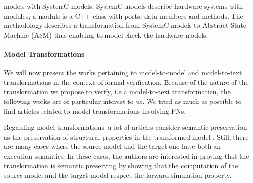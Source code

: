 \documentclass[pdflatex,sn-mathphys]{sn-jnl}%
\theoremstyle{thmstyleone}%
\theoremstyle{thmstyletwo}%
\theoremstyle{thmstylethree}%
\begin{document}
models with SystemC models. SystemC models describe hardware systems
with modules; a module is a C++ class with ports, data members and
methods. The methodology describes a transformation from SystemC
models to Abstract State Machine (ASM) thus enabling to model-check
the hardware models. %

\paragraph{Model Transformations}


We will now present the works pertaining to model-to-model and
model-to-text transformations in the context of formal
verification. Because of the nature of the transformation we propose
to verify, i.e a model-to-text transformation, the following works are
of particular interest to us.  We tried as much as possible to find
articles related to model transformations involving PNs.

Regarding model transformations, a lot of articles consider semantic
preservation as the preservation of structural properties in the
transformed model
\cite{Berramla2015,Calegari2011,Meghzili2017}. Still, there are many
cases where the source model and the target one have both an execution
semantics. In these cases, the authors are interested in proving that
the transformation is semantic preserving by showing that the
computation of the source model and the target model respect the
forward simulation property.
\end{document}
